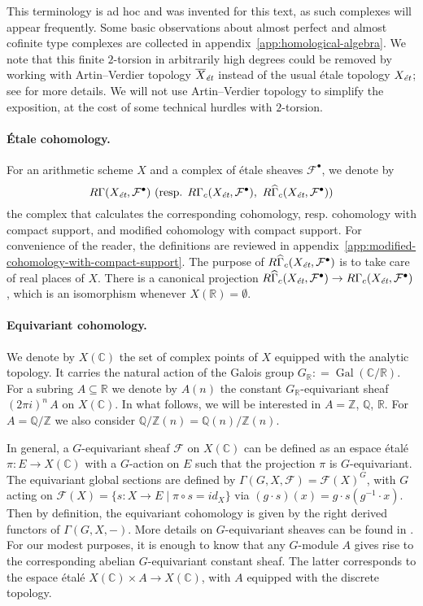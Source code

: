 \documentclass[leqno,12pt]{article}
\theoremstyle{plain}
\theoremstyle{definition}
\DeclareMathOperator{\Gal}{Gal}
\newcommand{\CC}{\mathbb{C}}
\newcommand{\QQ}{\mathbb{Q}}
\newcommand{\RR}{\mathbb{R}}
\newcommand{\ZZ}{\mathbb{Z}}
\newcommand{\dfn}{\mathrel{\mathop:}=}
\newcommand{\et}{\text{\it \'{e}t}}
\begin{document}
This terminology is ad hoc and was invented for this text, as such complexes
will appear frequently. Some basic observations about almost perfect and almost
cofinite type complexes are collected in
appendix~\ref{app:homological-algebra}. We note that this finite $2$-torsion
in arbitrarily high degrees could be removed by working with Artin--Verdier
topology $\overline{X}_\et$ instead of the usual \'{e}tale topology $X_\et$;
see \cite[Appendix~A]{Flach-Morin-2018} for more details. We will not use
Artin--Verdier topology to simplify the exposition, at the cost of some
technical hurdles with $2$-torsion.

\paragraph{\'{E}tale cohomology.}
For an arithmetic scheme $X$ and a complex of \'{e}tale sheaves
$\mathcal{F}^\bullet$, we denote by
\[ R\Gamma (X_\et, \mathcal{F}^\bullet) ~
\text{(resp. }R\Gamma_c (X_\et, \mathcal{F}^\bullet), ~
R\widehat{\Gamma}_c (X_\et, \mathcal{F}^\bullet)\text{)} \]
the complex that calculates the corresponding cohomology, resp. cohomology with
compact support, and modified cohomology with compact support. For convenience
of the reader, the definitions are reviewed in
appendix~\ref{app:modified-cohomology-with-compact-support}. The purpose of
$R\widehat{\Gamma}_c (X_\et, \mathcal{F}^\bullet)$ is to take care of real
places of $X$. There is a canonical projection
$R\widehat{\Gamma}_c (X_\et, \mathcal{F}^\bullet) \to R\Gamma_c (X_\et, \mathcal{F}^\bullet)$,
which is an isomorphism whenever $X (\RR) = \emptyset$.

\paragraph{Equivariant cohomology.}
We denote by $X (\CC)$ the set of complex points of $X$ equipped with the
analytic topology. It carries the natural action of the Galois group
$G_\RR \dfn \Gal (\CC/\RR)$. For a subring $A \subseteq \RR$ we denote by
$A (n)$ the constant $G_\RR$-equivariant sheaf $(2\pi i)^n \, A$ on
$X (\CC)$. In what follows, we will be interested in $A = \ZZ$, $\QQ$, $\RR$.
For $A = \QQ/\ZZ$ we also consider $\QQ/\ZZ (n) = \QQ (n)/\ZZ (n)$.

In general, a $G$-equivariant sheaf $\mathcal{F}$ on $X (\CC)$ can be defined as
an espace \'{e}tal\'{e} $\pi\colon E\to X (\CC)$ with a $G$-action on $E$ such that the
projection $\pi$ is $G$-equivariant. The equivariant global sections are defined
by $\Gamma (G,X,\mathcal{F}) = \mathcal{F} (X)^G$, with $G$ acting on
$\mathcal{F} (X) = \{ s\colon X\to E \mid \pi\circ s = id_X \}$ via
$(g\cdot s) (x) = g\cdot s (g^{-1}\cdot x)$. Then by definition, the equivariant
cohomology is given by the right derived functors of $\Gamma (G,X,-)$. More
details on $G$-equivariant sheaves can be found in
\cite[Chapitre~2]{Morin-these}. For our modest purposes, it is enough to know
that any $G$-module $A$ gives rise to the corresponding abelian $G$-equivariant
constant sheaf. The latter corresponds to the espace \'{e}tal\'{e}
$X (\CC)\times A \to X (\CC)$, with $A$ equipped with the discrete topology.
\end{document}
